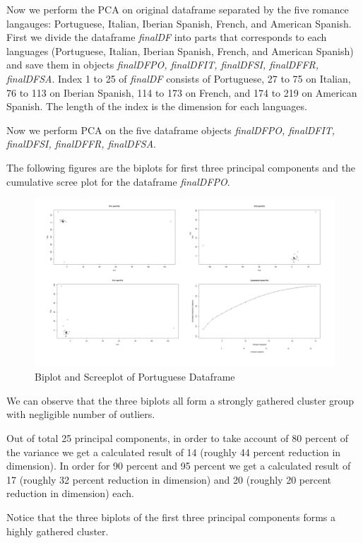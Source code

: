 Now we perform the PCA on original dataframe separated by the five romance langauges: Portuguese, Italian, Iberian Spanish, French, and American Spanish. First we divide the dataframe \emph{finalDF} into parts that corresponds to each languages (Portuguese, Italian, Iberian Spanish, French, and American Spanish) and save them in objects \emph{finalDFPO, finalDFIT, finalDFSI, finalDFFR, finalDFSA}. Index 1 to 25 of \emph{finalDF} consists of Portuguese, 27 to 75 on Italian, 76 to 113 on Iberian Spanish, 114 to 173 on French, and 174 to 219 on American Spanish. The length of the index is the dimension for each languages.

Now we perform PCA on the five dataframe objects \emph{finalDFPO, finalDFIT, finalDFSI, finalDFFR, finalDFSA}. 

The following figures are the biplots for first three principal components and the cumulative scree plot for the dataframe \emph{finalDFPO}.

\begin{figure}[H]
    \centering
    \includegraphics[width=15cm]{images/PCA/4plotPO.png}
    \caption{Biplot and Screeplot of Portuguese Dataframe}
    \label{fig:4plotPO} 
\end{figure}

We can observe that the three biplots all form a strongly gathered cluster group with negligible number of outliers.

Out of total 25 principal components, in order to take account of 80 percent of the variance we get a calculated result of 14 (roughly 44 percent reduction in dimension). In order for 90 percent and 95 percent we get a calculated result of 17 (roughly 32 percent reduction in dimension) and 20 (roughly 20 percent reduction in dimension) each. 

Notice that the three biplots of the first three principal components forms a highly gathered cluster.

